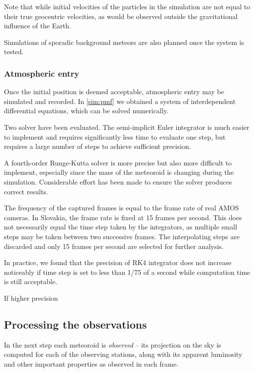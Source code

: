             Note that while initial velocities of the particles in the simulation are not equal to their true geocentric velocities,
            as would be observed outside the gravitational influence of the Earth.
            
            Simulations of sporadic background meteors are also planned once the system is tested.

        \subsubsection{Atmospheric entry}
            Once the initial position is deemed acceptable, atmospheric entry may be simulated and recorded.            
            In \ref{sim:pmf} we obtained a system of interdependent differential equations,
            which can be solved numerically.
            
            Two solver have been evaluated. The semi-implicit Euler integrator is much easier to
            implement and requires significantly less time to evaluate one step, but requires a large number
            of steps to achieve sufficient precision.

            A fourth-order Runge-Kutta solver is more precise but also more difficult to implement,
            especially since the mass of the meteoroid is changing during the simulation.
            Considerable effort has been made to ensure the solver produces correct results.
            
            The frequency of the captured frames is equal to the frame rate of real AMOS cameras.
            In Slovakia, the frame rate is fixed at 15 frames per second.            
            This does not necessarily equal the time step taken by the integrators,
            as multiple small steps may be taken between two successive frames.
            The interpolating steps are discarded and only 15 frames per second
            are selected for further analysis.
            
            In practice, we found that the precision of RK4 integrator does not
            increase noticeably if time step is set to less than 1/75 of a second
            while computation time is still acceptable. 
            
            If higher precision
            
    \subsection{Processing the observations} \label{sim:al:po}
        In the next step each meteoroid is \emph{observed} -- its projection on the sky
        is computed for each of the observing stations, along with its apparent luminosity
        and other important properties as observed in each frame.
        
